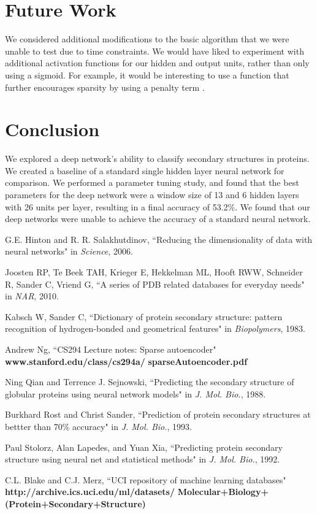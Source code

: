 \documentclass[letterpaper,twocolumn,12pt]{article}
\begin{document}
\section{Future Work}
We considered additional modifications to the basic algorithm that we were unable to test due to time constraints.
We would have liked to experiment with additional activation functions for our hidden and output units, rather than only using a sigmoid.
For example, it would be interesting to use a function that further encourages sparsity by using a penalty term \cite{Ng}.

\section{Conclusion}
We explored a deep network's ability to classify secondary structures in proteins.
We created a baseline of a standard single hidden layer neural network for comparison.
We performed a parameter tuning study, and found that the best parameters for the deep network were a window size of 13 and 6 hidden layers with 26 units per layer, resulting in a final accuracy of 53.2\%.
We found that our deep networks were unable to achieve the accuracy of a standard neural network.

\begin{thebibliography}{9}


G.E. Hinton and R. R. Salakhutdinov,
   ``Reducing the dimensionality of data with neural networks"
   in \emph{Science}, 2006.

Joosten RP, Te Beek TAH, Krieger E, Hekkelman ML, Hooft RWW, Schneider R, Sander C, Vriend G,
   ``A series of PDB related databases for everyday needs"
   in \emph{NAR}, 2010.

Kabsch W, Sander C,
   ``Dictionary of protein secondary structure: pattern recognition of hydrogen-bonded and geometrical features"
   in \emph{Biopolymers}, 1983.

Andrew Ng,
   ``CS294 Lecture notes: Sparse autoencoder"
   \textbf{www.stanford.edu/class/cs294a/}
   \textbf{sparseAutoencoder.pdf}

Ning Qian and Terrence J. Sejnowski,
  ``Predicting the secondary structure of globular proteins using neural network models"
  in \emph{J. Mol. Bio.}, 1988.

Burkhard Rost and Christ Sander,
  ``Prediction of protein secondary structures at bettter than 70\% accuracy"
  in \emph{J. Mol. Bio.}, 1993.

Paul Stolorz, Alan Lapedes, and Yuan Xia,
   ``Predicting protein secondary structure using neural net and statistical methods"
   in \emph{J. Mol. Bio.}, 1992.

   C.L. Blake and C.J. Merz,
   ``UCI repository of machine learning databases"
   \textbf{http://archive.ics.uci.edu/ml/datasets/}
   \textbf{Molecular+Biology+}
   \textbf{(Protein+Secondary+Structure)}

\end{thebibliography}
\end{document}
